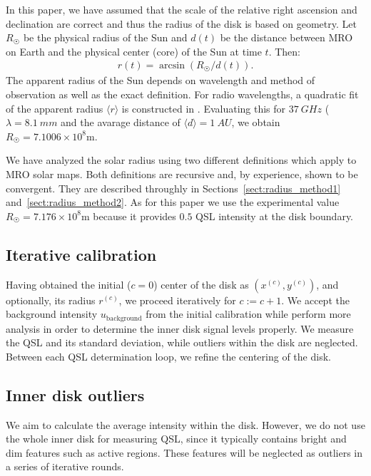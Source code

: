 \documentclass{aa}
\newcommand{\eqnl}[2]{\begin{eqnarray}\label{#1}#2\end{eqnarray}}
\newcommand{\ave}[1]{\langle #1 \rangle}
\newcommand{\s}[2]{{#1}_{\mathrm{#2}}}
\begin{document}
  In this paper, we have assumed that the scale of the relative right ascension and declination are correct and thus the 
  radius of the disk is based on geometry. Let $R_{\astrosun}$ be the physical radius of the Sun and $d(t)$ be the distance 
  between MRO on Earth and the physical center (core) of the Sun at time $t$. Then:
  \eqnl{visual_angle}{
  r(t) = \arcsin \left( R_{\astrosun} / d(t) \right) \text{.}
  }
  The apparent radius of the Sun depends on wavelength and method of observation as well as the exact definition. For radio wavelengths, a quadratic fit 
  of the apparent radius $\ave r$ is constructed in \cite{Rozelot15}. Evaluating this for $\SI{37}{GHz}$ ($\lambda = 
  \SI{8.1}{mm}$ and the avarage distance of $\ave d = \SI{1}{AU}$, we obtain $R_{\astrosun} = 7.1006 \times 10^8 
  \mathrm{m}$.

  We have analyzed the solar radius using two different definitions which apply to MRO solar maps. Both definitions are 
  recursive and, by experience, shown to be convergent. They are described throughly in 
  Sections~\ref{sect:radius_method1} and~\ref{sect:radius_method2}. As for this paper we use the experimental value 
  $R_{\astrosun} = 7.176 \times 10^8 \mathrm{m}$ because it provides $0.5$ QSL intensity at the disk boundary.

  \subsection{Iterative calibration} \label{sect:further_optimization}

  Having obtained the initial ($c=0$) center of the disk as $(x^{(c)}, y^{(c)})$, and optionally, its radius $r^{(c)}$, we 
  proceed iteratively for $c:=c+1$. We accept the background intensity $\s{u}{background}$ from the initial calibration while perform 
  more analysis in order to determine the inner disk signal levels properly. We measure the QSL and its standard 
  deviation, while outliers within the disk are neglected. Between each QSL determination loop, we refine the centering 
  of the disk.
  
  \subsection{Inner disk outliers} \label{sect:disk_outliers}

  We aim to calculate the average intensity within the disk. However, we do not use the whole inner disk for measuring 
  QSL, since it typically contains bright and dim features such as active regions. These features will be neglected as 
  outliers in a series of iterative rounds.
\end{document}
